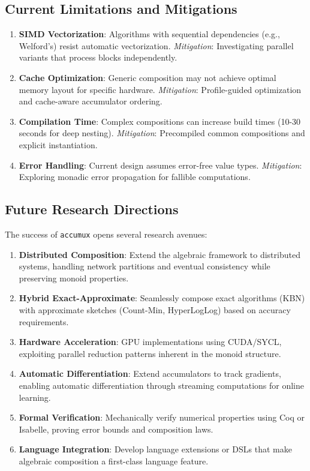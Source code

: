 \documentclass[sigconf]{acmart}
\newcommand{\accumux}{\texttt{accumux}\xspace}
\begin{document}
\subsection{Current Limitations and Mitigations}

\begin{enumerate}
\item \textbf{SIMD Vectorization}: Algorithms with sequential dependencies (e.g., Welford's) resist automatic vectorization.
   \textit{Mitigation}: Investigating parallel variants that process blocks independently.

\item \textbf{Cache Optimization}: Generic composition may not achieve optimal memory layout for specific hardware.
   \textit{Mitigation}: Profile-guided optimization and cache-aware accumulator ordering.

\item \textbf{Compilation Time}: Complex compositions can increase build times (10-30 seconds for deep nesting).
   \textit{Mitigation}: Precompiled common compositions and explicit instantiation.

\item \textbf{Error Handling}: Current design assumes error-free value types.
   \textit{Mitigation}: Exploring monadic error propagation for fallible computations.
\end{enumerate}

\subsection{Future Research Directions}

The success of \accumux opens several research avenues:

\begin{enumerate}
\item \textbf{Distributed Composition}: Extend the algebraic framework to distributed systems, handling network partitions and eventual consistency while preserving monoid properties.

\item \textbf{Hybrid Exact-Approximate}: Seamlessly compose exact algorithms (KBN) with approximate sketches (Count-Min, HyperLogLog) based on accuracy requirements.

\item \textbf{Hardware Acceleration}: GPU implementations using CUDA/SYCL, exploiting parallel reduction patterns inherent in the monoid structure.

\item \textbf{Automatic Differentiation}: Extend accumulators to track gradients, enabling automatic differentiation through streaming computations for online learning.

\item \textbf{Formal Verification}: Mechanically verify numerical properties using Coq or Isabelle, proving error bounds and composition laws.

\item \textbf{Language Integration}: Develop language extensions or DSLs that make algebraic composition a first-class language feature.
\end{enumerate}
\end{document}
